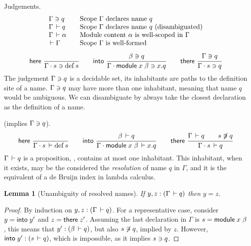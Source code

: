 \documentclass{article}
\theoremstyle{definition}
\theoremstyle{plain}
\newtheorem{lemma}{Lemma}
\theoremstyle{remark}
\begin{document}
Judgements.
\[
\begin{array}{l@{\qquad}l}
  \Contains \Gamma q & \mbox{Scope $\Gamma$ declares name $q$} \\
  \Declares \Gamma q & \mbox{Scope $\Gamma$ declares name $q$ (disambiguated)} \\
  \WContent \Gamma \alpha & \mbox{Module content $\alpha$ is well-scoped in $\Gamma$}\\
  \WScope \Gamma & \mbox{Scope $\Gamma$ is well-formed}
\end{array}
\]
\begin{gather*}
  \nru{\rhere
     }{
     }{\Contains {\Gamma \chop s} {\defined s}}
\qquad
  \nru{\rinto
     }{\Contains \beta q
     }{\Contains {\Gamma \chop \mdef x \beta} {x.q}}
\qquad
   \nru{\rthere
      }{\Contains \Gamma q
      }{\Contains {\Gamma \chop s} q}
\end{gather*}
The judgement $\Gamma\ni q$ is a decidable set, its inhabitants
are paths to the definition site of a name.
$\Gamma\ni q$ may have more than one inhabitant, meaning that
name $q$ would be ambiguous.
We can disambiguate by always take the closest declaration as the
definition of a name.

 (implies $\Gamma\ni q$).
\begin{gather*}
  \nru{\rhere
     }{
     }{\Declares {\Gamma \chop s} {\defined s}}
\qquad
  \nru{\rinto
     }{\Declares \beta q
     }{\Declares {\Gamma \chop \mdef x \beta} {x.q}}
\qquad
   \nru{\rthere
      }{\Declares \Gamma q \qquad \NotContains s q
      }{\Declares {\Gamma \chop s} q}
\end{gather*}
$\Gamma\,\vdash q$ is a proposition, \ie, contains at most one
inhabitant.  This inhabitant, when it exists, may be the considered
the \emph{resolution} of name $q$ in $\Gamma$, and it is the
equivalent of a de Bruijn index in lambda calculus.
\begin{lemma}[Unambiguity of resolved names]
  If $y,z : (\Gamma\,\vdash q)$ then $y = z$.
\end{lemma}
\begin{proof}
  By induction on $y,z : (\Gamma\,\vdash q)$.
  For a representative case, consider
  $y = \mathsf{into}\;y'$ and $z = \mathsf{there}\;z'$.
  Assuming the last declaration in $\Gamma$ is $s = \mathsf{module}\;x\;\beta$,
  this means that $y' : (\beta\,\vdash q)$,
  but also $s\not\owns q$, implied by $z$.  However,
  $\mathsf{into}\;y' : (s\,\vdash q)$, which is impossible, as it implies
  $s\ni q$.
\end{proof}
\end{document}
